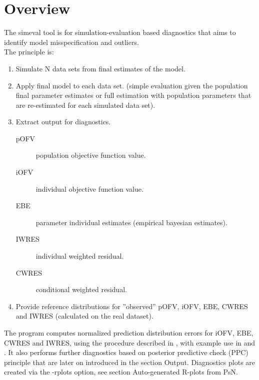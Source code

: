 



\maketitle
\newcommand{\guidetoolname}{simeval}


\section{Overview}

The simeval tool is for simulation-evaluation based diagnostics that aims to identify model misspecification and outliers.\\
The principle is:
\begin{enumerate}
\item Simulate N data sets from final estimates of the model.
\item Apply final model to each data set.
(simple evaluation given the population final parameter estimates or full estimation with population parameters that are re-estimated for each simulated data set).
\item Extract output for diagnostics.
\begin{description}
\item[pOFV] population objective function value.
\item[iOFV] individual objective function value.
\item[EBE] parameter individual estimates (empirical bayesian estimates).
\item[IWRES] individual weighted residual.
\item[CWRES] conditional weighted residual.
\end{description}
\item Provide reference distributions for ”observed” pOFV, iOFV, EBE, CWRES and IWRES (calculated on the real dataset).
\end{enumerate}
The program computes normalized prediction distribution errors for iOFV, EBE, CWRES and IWRES, using the procedure described in \cite{Comets}, with example use in \cite{Keizer} and \cite{Largajolli}. It also performs further diagnostics based on posterior predictive check (PPC) principle that are later on introduced in the section Output. Diagnostics plots are created via the -rplots option, see section Auto-generated R-plots from PsN.\\

